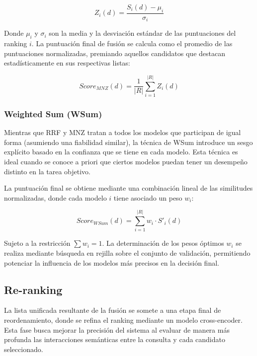 \begin{equation}
    Z_{i}(d) = \frac{S_{i}(d) - \mu_i}{\sigma_i}
\end{equation}

Donde $\mu_i$ y $\sigma_i$ son la media y la desviación estándar de las puntuaciones del ranking $i$. La puntuación final de fusión se calcula como el promedio de las puntuaciones normalizadas, premiando aquellos candidatos que destacan estadísticamente en sus respectivas listas:

\begin{equation}
    Score_{MNZ}(d) = \frac{1}{|R|} \sum_{i=1}^{|R|} Z_{i}(d)
\end{equation}

\subsubsection{Weighted Sum (WSum)}

\noindent Mientras que \gls{RRF} y \gls{MNZ} tratan a todos los modelos que participan de igual forma (asumiendo una fiabilidad similar), la técnica de \gls{WSum} introduce un sesgo explícito basado en la confianza que se tiene en cada modelo. Esta técnica es ideal cuando se conoce a priori que ciertos modelos puedan tener un desempeño distinto en la tarea objetivo.

La puntuación final se obtiene mediante una combinación lineal de las similitudes normalizadas, donde cada modelo $i$ tiene asociado un peso $w_i$:

\begin{equation}
    Score_{WSum}(d) = \sum_{i=1}^{|R|} w_i \cdot S'_{i}(d)
\end{equation}

Sujeto a la restricción $\sum w_i = 1$. La determinación de los pesos óptimos $w_i$ se realiza mediante búsqueda en rejilla sobre el conjunto de validación, permitiendo potenciar la influencia de los modelos más precisos en la decisión final.

\subsection{Re-ranking}

\noindent La lista unificada resultante de la fusión se somete a una etapa final de reordenamiento, donde se refina el ranking mediante un modelo cross-encoder. Esta fase busca mejorar la precisión del sistema al evaluar de manera más profunda las interacciones semánticas entre la consulta y cada candidato seleccionado.

